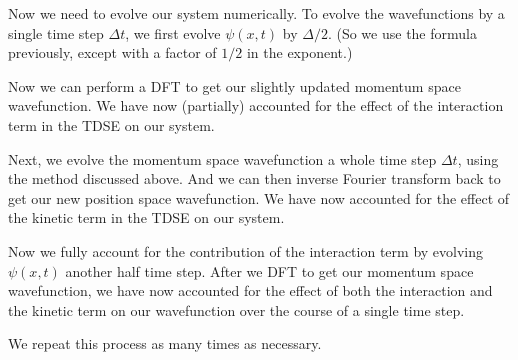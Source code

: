 \documentclass{booknotes}
\begin{document}
Now we need to evolve our system numerically.
To evolve the wavefunctions by a single time step $\Delta t$, we first evolve $\psi(x,t)$ by $\Delta /2$. (So we use the formula previously, except with a factor of $1/2$ in the exponent.) 

Now we can perform a DFT to get our slightly updated momentum space wavefunction.
We have now (partially) accounted for the effect of the interaction term in the TDSE on our system.

Next, we evolve the momentum space wavefunction a whole time step $\Delta t$, using the method discussed above. And we can then inverse Fourier transform back to get our new position space wavefunction.
We have now accounted for the effect of the kinetic term in the TDSE on our system.

Now we fully account for the contribution of the interaction term by evolving $\psi(x,t)$ another half time step. After we DFT to get our momentum space wavefunction, we have now accounted for the effect of both the interaction and the kinetic term on our wavefunction over the course of a single time step.

We repeat this process as many times as necessary.
\end{document}
